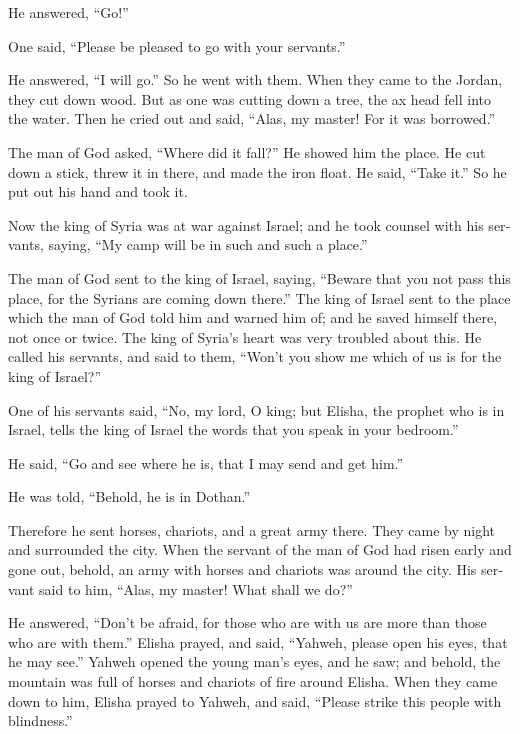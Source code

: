 \begin{paracol}{2}
\begin{otherlanguage}{english}
He answered, ``Go!''

 One said, ``Please be pleased to go with your servants.''

He answered, ``I will go.''  So he went with them. When
they came to the Jordan, they cut down wood.  But as one
was cutting down a tree, the ax head fell into the water. Then he cried
out and said, ``Alas, my master! For it was borrowed.''

 The man of God asked, ``Where did it fall?'' He showed
him the place. He cut down a stick, threw it in there, and made the iron
float.  He said, ``Take it.'' So he put out his hand and
took it.

 Now the king of Syria was at war against Israel; and he
took counsel with his servants, saying, ``My camp will be in such and
such a place.''

 The man of God sent to the king of Israel, saying,
``Beware that you not pass this place, for the Syrians are coming down
there.''  The king of Israel sent to the place which the
man of God told him and warned him of; and he saved himself there, not
once or twice.  The king of Syria's heart was very
troubled about this. He called his servants, and said to them, ``Won't
you show me which of us is for the king of Israel?''

 One of his servants said, ``No, my lord, O king; but
Elisha, the prophet who is in Israel, tells the king of Israel the words
that you speak in your bedroom.''

 He said, ``Go and see where he is, that I may send and
get him.''

He was told, ``Behold, he is in Dothan.''

 Therefore he sent horses, chariots, and a great army
there. They came by night and surrounded the city.  When
the servant of the man of God had risen early and gone out, behold, an
army with horses and chariots was around the city. His servant said to
him, ``Alas, my master! What shall we do?''

 He answered, ``Don't be afraid, for those who are with
us are more than those who are with them.''  Elisha
prayed, and said, ``Yahweh, please open his eyes, that he may see.''
Yahweh opened the young man's eyes, and he saw; and behold, the mountain
was full of horses and chariots of fire around Elisha. 
When they came down to him, Elisha prayed to Yahweh, and said, ``Please
strike this people with blindness.''


\end{otherlanguage}
\end{paracol}
